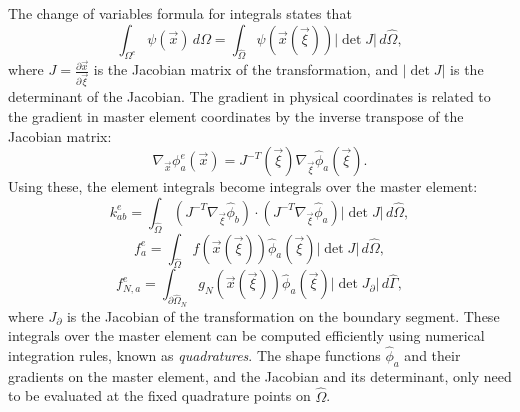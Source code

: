 The change of variables formula for integrals states that
\begin{equation*}
\int_{\Omega^e} \psi(\vec{x}) \, d\Omega = \int_{\hat{\Omega}} \psi(\vec{x}(\vec{\xi})) |\det J| \, d\hat{\Omega},
\end{equation*}
where $J = \frac{\partial \vec{x}}{\partial \vec{\xi}}$ is the Jacobian matrix of the transformation, and $|\det J|$ is the determinant of the Jacobian.
The gradient in physical coordinates is related to the gradient in master element coordinates by the inverse transpose of the Jacobian matrix:
\begin{equation*}
\nabla_{\vec{x}} \phi_a^e(\vec{x}) = J^{-T}(\vec{\xi}) \nabla_{\vec{\xi}} \hat{\phi}_a(\vec{\xi}).
\end{equation*}
Using these, the element integrals become integrals over the master element:
\begin{equation*}
k_{ab}^e = \int_{\hat{\Omega}} (J^{-T} \nabla_{\vec{\xi}} \hat{\phi}_b) \cdot (J^{-T} \nabla_{\vec{\xi}} \hat{\phi}_a) |\det J| \, d\hat{\Omega},
\end{equation*}
\begin{equation*}
f_a^e = \int_{\hat{\Omega}} f(\vec{x}(\vec{\xi})) \hat{\phi}_a(\vec{\xi}) |\det J| \, d\hat{\Omega},
\end{equation*}
\begin{equation*}
f_{N,a}^e = \int_{\partial\hat{\Omega}_N} g_N(\vec{x}(\vec{\xi})) \hat{\phi}_a(\vec{\xi}) |\det J_{\partial}| \, d\hat{\Gamma},
\end{equation*}
where $J_\partial$ is the Jacobian of the transformation on the boundary segment. These integrals over the master element can be computed efficiently using numerical integration rules, known as \textit{quadratures}. The shape functions $\hat{\phi}_a$ and their gradients on the master element, and the Jacobian and its determinant, only need to be evaluated at the fixed quadrature points on $\hat{\Omega}$.

